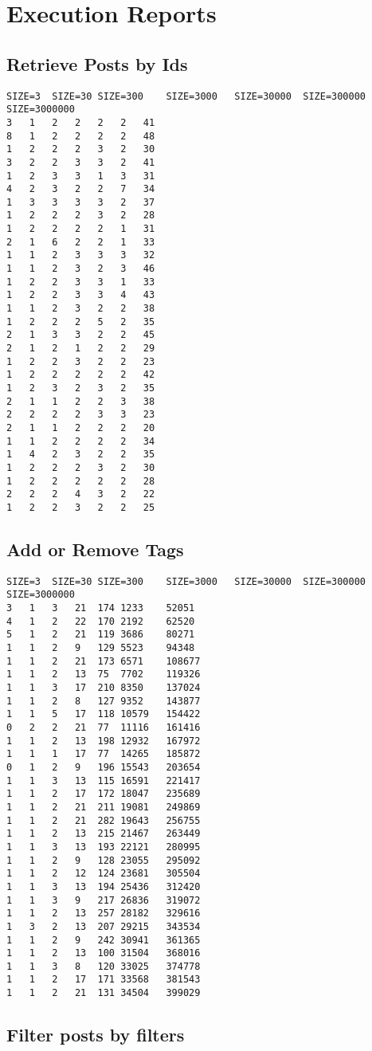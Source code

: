 
\chapter{Execution Reports}

\section{Retrieve Posts by Ids}
\label{data:retrievePostByIds01}

\begin{lstlisting}
SIZE=3	SIZE=30	SIZE=300	SIZE=3000	SIZE=30000	SIZE=300000	SIZE=3000000
3	1	2	2	2	2	41
8	1	2	2	2	2	48
1	2	2	2	3	2	30
3	2	2	3	3	2	41
1	2	3	3	1	3	31
4	2	3	2	2	7	34
1	3	3	3	3	2	37
1	2	2	2	3	2	28
1	2	2	2	2	1	31
2	1	6	2	2	1	33
1	1	2	3	3	3	32
1	1	2	3	2	3	46
1	2	2	3	3	1	33
1	2	2	3	3	4	43
1	1	2	3	2	2	38
1	2	2	2	5	2	35
2	1	3	3	2	2	45
2	1	2	1	2	2	29
1	2	2	3	2	2	23
1	2	2	2	2	2	42
1	2	3	2	3	2	35
2	1	1	2	2	3	38
2	2	2	2	3	3	23
2	1	1	2	2	2	20
1	1	2	2	2	2	34
1	4	2	3	2	2	35
1	2	2	2	3	2	30
1	2	2	2	2	2	28
2	2	2	4	3	2	22
1	2	2	3	2	2	25
\end{lstlisting}

\section{Add or Remove Tags}
\label{data:addOrRemoveTags01}

\begin{lstlisting}
SIZE=3	SIZE=30	SIZE=300	SIZE=3000	SIZE=30000	SIZE=300000	SIZE=3000000
3	1	3	21	174	1233	52051
4	1	2	22	170	2192	62520
5	1	2	21	119	3686	80271
1	1	2	9	129	5523	94348
1	1	2	21	173	6571	108677
1	1	2	13	75	7702	119326
1	1	3	17	210	8350	137024
1	1	2	8	127	9352	143877
1	1	5	17	118	10579	154422
0	2	2	21	77	11116	161416
1	1	2	13	198	12932	167972
1	1	1	17	77	14265	185872
0	1	2	9	196	15543	203654
1	1	3	13	115	16591	221417
1	1	2	17	172	18047	235689
1	1	2	21	211	19081	249869
1	1	2	21	282	19643	256755
1	1	2	13	215	21467	263449
1	1	3	13	193	22121	280995
1	1	2	9	128	23055	295092
1	1	2	12	124	23681	305504
1	1	3	13	194	25436	312420
1	1	3	9	217	26836	319072
1	1	2	13	257	28182	329616
1	3	2	13	207	29215	343534
1	1	2	9	242	30941	361365
1	1	2	13	100	31504	368016
1	1	3	8	120	33025	374778
1	1	2	17	171	33568	381543
1	1	2	21	131	34504	399029
\end{lstlisting}

\section{Filter posts by filters}
\label{data:filterPostsByFilters}

